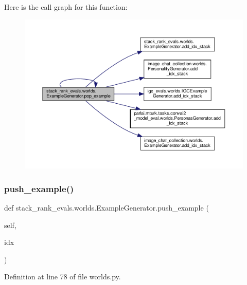 Here is the call graph for this function\+:
\nopagebreak
\begin{figure}[H]
\begin{center}
\leavevmode
\includegraphics[width=350pt]{classstack__rank__evals_1_1worlds_1_1ExampleGenerator_ae50d35087dd679c73aa8f5354845199f_cgraph}
\end{center}
\end{figure}
\mbox{\label{classstack__rank__evals_1_1worlds_1_1ExampleGenerator_a75b62011b063cb2879cca50917383d0e}} 
\subsubsection{\texorpdfstring{push\+\_\+example()}{push\_example()}\hspace{0.1cm}{\footnotesize\ttfamily [1/2]}}
{\footnotesize\ttfamily def stack\+\_\+rank\+\_\+evals.\+worlds.\+Example\+Generator.\+push\+\_\+example (\begin{DoxyParamCaption}\item[{}]{self,  }\item[{}]{idx }\end{DoxyParamCaption})}



Definition at line 78 of file worlds.\+py.



